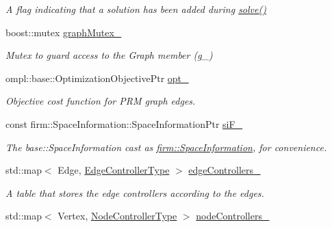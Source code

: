 \begin{DoxyCompactItemize}
\begin{DoxyCompactList}\small\item\em \-A flag indicating that a solution has been added during \hyperlink{class_f_i_r_m_a02f3c98de4840594193ba5bf7ff3ca63}{solve()} \end{DoxyCompactList}\item 
\hypertarget{class_f_i_r_m_ae71c316b447bb7b404dc27c8d673fd55}{boost\-::mutex \hyperlink{class_f_i_r_m_ae71c316b447bb7b404dc27c8d673fd55}{graph\-Mutex\-\_\-}}\label{class_f_i_r_m_ae71c316b447bb7b404dc27c8d673fd55}

\begin{DoxyCompactList}\small\item\em \-Mutex to guard access to the \-Graph member (g\-\_\-) \end{DoxyCompactList}\item 
\hypertarget{class_f_i_r_m_aac6a297cb2f700d31396b8cd5a88e81b}{ompl\-::base\-::\-Optimization\-Objective\-Ptr \hyperlink{class_f_i_r_m_aac6a297cb2f700d31396b8cd5a88e81b}{opt\-\_\-}}\label{class_f_i_r_m_aac6a297cb2f700d31396b8cd5a88e81b}

\begin{DoxyCompactList}\small\item\em \-Objective cost function for \-P\-R\-M graph edges. \end{DoxyCompactList}\item 
\hypertarget{class_f_i_r_m_afd4f91dc510bf7b5b68b4da5cfd90718}{const \*
firm\-::\-Space\-Information\-::\-Space\-Information\-Ptr \hyperlink{class_f_i_r_m_afd4f91dc510bf7b5b68b4da5cfd90718}{si\-F\-\_\-}}\label{class_f_i_r_m_afd4f91dc510bf7b5b68b4da5cfd90718}

\begin{DoxyCompactList}\small\item\em \-The base\-::\-Space\-Information cast as \hyperlink{classfirm_1_1_space_information}{firm\-::\-Space\-Information}, for convenience. \end{DoxyCompactList}\item 
\hypertarget{class_f_i_r_m_abfacc68b478054d0b99a3965d33d718a}{std\-::map$<$ \-Edge, \*
\hyperlink{class_f_i_r_m_a70abcb24fbc9f836b94119f65c8f8a37}{\-Edge\-Controller\-Type} $>$ \hyperlink{class_f_i_r_m_abfacc68b478054d0b99a3965d33d718a}{edge\-Controllers\-\_\-}}\label{class_f_i_r_m_abfacc68b478054d0b99a3965d33d718a}

\begin{DoxyCompactList}\small\item\em \-A table that stores the edge controllers according to the edges. \end{DoxyCompactList}\item 
\hypertarget{class_f_i_r_m_ac80211b920fb34ee04779c9af2c0d1c4}{std\-::map$<$ \-Vertex, \*
\hyperlink{class_controller}{\-Node\-Controller\-Type} $>$ \hyperlink{class_f_i_r_m_ac80211b920fb34ee04779c9af2c0d1c4}{node\-Controllers\-\_\-}}\label{class_f_i_r_m_ac80211b920fb34ee04779c9af2c0d1c4}


\end{DoxyCompactItemize}
